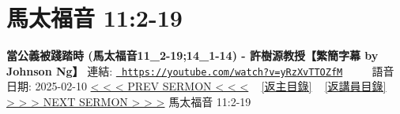 \documentclass{book}
\begin{document}
\section{馬太福音 11:2-19}
\label{sec:yRzXvTTOZfM}
\textbf{當公義被踐踏時  (馬太福音11\_2-19;14\_1-14) - 許樹源教授【繁簡字幕 by Johnson Ng】}
\newline
\newline
連結: \href{https://youtube.com/watch?v=yRzXvTTOZfM}{\texttt{ https://youtube.com/watch?v=yRzXvTTOZfM}} ~~~~ 語音日期: 2025-02-10 
\newline
\newline
\hyperref[sec:w_ajWsBZ9eQ]{< < < PREV SERMON < < <}
~
\hyperlink{toc}{[返主目錄]}
~
\hyperref[ch:preacher11]{[返講員目錄]}
~
\hyperref[sec:srCkvhUNl9w]{> > > NEXT SERMON > > >}
\newline
\newline
馬太福音 11:2-19
\newline
\end{document}
